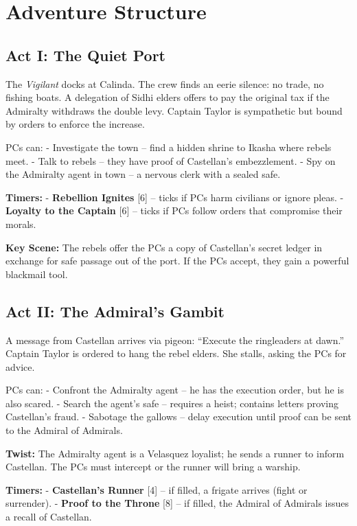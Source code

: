 \documentclass[11pt]{article}
\begin{document}
\section{Adventure Structure}

\subsection{Act I: The Quiet Port}
The \textit{Vigilant} docks at Calinda. The crew finds an eerie silence: no trade, no fishing boats. A delegation of Sidhi elders offers to pay the original tax if the Admiralty withdraws the double levy. Captain Taylor is sympathetic but bound by orders to enforce the increase.

PCs can:
- Investigate the town -- find a hidden shrine to Ikasha where rebels meet.
- Talk to rebels -- they have proof of Castellan's embezzlement.
- Spy on the Admiralty agent in town -- a nervous clerk with a sealed safe.

\textbf{Timers:}
- \textbf{Rebellion Ignites} [6] -- ticks if PCs harm civilians or ignore pleas.
- \textbf{Loyalty to the Captain} [6] -- ticks if PCs follow orders that compromise their morals.

\textbf{Key Scene:} The rebels offer the PCs a copy of Castellan's secret ledger in exchange for safe passage out of the port. If the PCs accept, they gain a powerful blackmail tool.

\subsection{Act II: The Admiral's Gambit}
A message from Castellan arrives via pigeon: ``Execute the ringleaders at dawn.'' Captain Taylor is ordered to hang the rebel elders. She stalls, asking the PCs for advice.

PCs can:
- Confront the Admiralty agent -- he has the execution order, but he is also scared.
- Search the agent's safe -- requires a heist; contains letters proving Castellan's fraud.
- Sabotage the gallows -- delay execution until proof can be sent to the Admiral of Admirals.

\textbf{Twist:} The Admiralty agent is a Velasquez loyalist; he sends a runner to inform Castellan. The PCs must intercept or the runner will bring a warship.

\textbf{Timers:}
- \textbf{Castellan's Runner} [4] -- if filled, a frigate arrives (fight or surrender).
- \textbf{Proof to the Throne} [8] -- if filled, the Admiral of Admirals issues a recall of Castellan.
\end{document}
